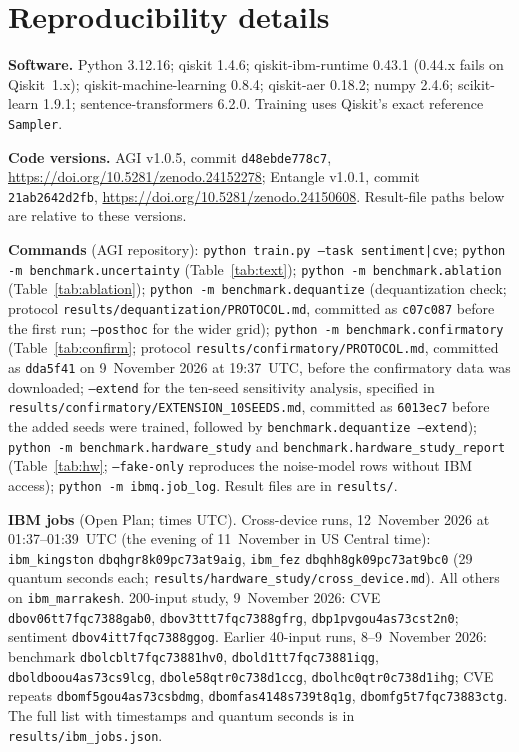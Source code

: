 \documentclass[11pt]{article}
\begin{document}



\appendix
\section{Reproducibility details}\label{app:repro}
\sloppy
\textbf{Software.} Python 3.12.16; qiskit 1.4.6; qiskit-ibm-runtime 0.43.1 (0.44.x fails on Qiskit~1.x); qiskit-machine-learning 0.8.4; qiskit-aer 0.18.2; numpy 2.4.6; scikit-learn 1.9.1; sentence-transformers 6.2.0. Training uses Qiskit's exact reference \texttt{Sampler}.

\textbf{Code versions.} AGI v1.0.5, commit \texttt{d48ebde778c7}, \url{https://doi.org/10.5281/zenodo.24152278}; Entangle v1.0.1, commit \texttt{21ab2642d2fb}, \url{https://doi.org/10.5281/zenodo.24150608}. Result-file paths below are relative to these versions.

\textbf{Commands} (AGI repository): \texttt{python train.py --task sentiment|cve}; \texttt{python -m benchmark.uncertainty} (Table~\ref{tab:text}); \texttt{python -m benchmark.ablation} (Table~\ref{tab:ablation}); \texttt{python -m benchmark.dequantize} (dequantization check; protocol \texttt{results/dequantization/PROTOCOL.md}, committed as \texttt{c07c087} before the first run; \texttt{--posthoc} for the wider grid); \texttt{python -m benchmark.confirmatory} (Table~\ref{tab:confirm}; protocol \texttt{results/confirmatory/PROTOCOL.md}, committed as \texttt{dda5f41} on 9~November 2026 at 19:37~UTC, before the confirmatory data was downloaded; \texttt{--extend} for the ten-seed sensitivity analysis, specified in \texttt{results/confirmatory/EXTENSION\_10SEEDS.md}, committed as \texttt{6013ec7} before the added seeds were trained, followed by \texttt{benchmark.dequantize --extend}); \texttt{python -m benchmark.hardware\_study} and \texttt{benchmark.hardware\_study\_report} (Table~\ref{tab:hw}; \texttt{--fake-only} reproduces the noise-model rows without IBM access); \texttt{python -m ibmq.job\_log}. Result files are in \texttt{results/}.

\textbf{IBM jobs} (Open Plan; times UTC). Cross-device runs, 12~November 2026 at 01:37--01:39~UTC (the evening of 11~November in US Central time): \texttt{ibm\_kingston} \texttt{dbqhgr8k09pc73at9aig}, \texttt{ibm\_fez} \texttt{dbqhh8gk09pc73at9bc0} (29 quantum seconds each; \texttt{results/hardware\_study/cross\_device.md}). All others on \texttt{ibm\_marrakesh}. 200-input study, 9~November 2026: CVE \texttt{dbov06tt7fqc7388gab0}, \texttt{dbov3ttt7fqc7388gfrg}, \texttt{dbp1pvgou4as73cst2n0}; sentiment \texttt{dbov4itt7fqc7388ggog}. Earlier 40-input runs, 8--9~November 2026: benchmark \texttt{dbolcblt7fqc73881hv0}, \texttt{dbold1tt7fqc73881iqg}, \texttt{dboldboou4as73cs9lcg}, \texttt{dbole58qtr0c738d1ccg}, \texttt{dbolhc0qtr0c738d1ihg}; CVE repeats \texttt{dbomf5gou4as73csbdmg}, \texttt{dbomfas4148s739t8q1g}, \texttt{dbomfg5t7fqc73883ctg}. The full list with timestamps and quantum seconds is in \texttt{results/ibm\_jobs.json}.
\end{document}
